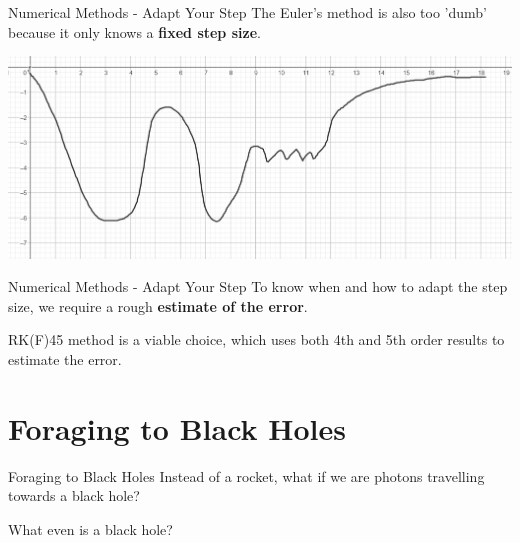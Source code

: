 \documentclass{beamer}
\begin{document}
\begin{frame}{Numerical Methods - Adapt Your Step}
    The Euler's method is also too 'dumb' because it only knows a \textbf{fixed step size}.

    \centering
    \includegraphics[width=\textwidth]{asset/func.png}
\end{frame}


\begin{frame}{Numerical Methods - Adapt Your Step}
    To know when and how to adapt the step size, we require a rough \textbf{estimate of the error}.

    \vspace{0.5cm}

    RK(F)45 method is a viable choice, which uses both 4th and 5th order results to estimate the error.
\end{frame}


\section{Foraging to Black Holes}


\begin{frame}{Foraging to Black Holes}
    Instead of a rocket, what if we are photons travelling towards a black hole?

    \vspace{0.5cm}

    \begin{center}
        {\Large What even is a black hole?}
    \end{center}
\end{frame}
\end{document}
